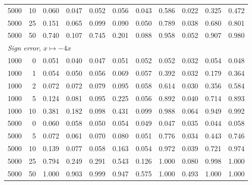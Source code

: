 \begin{table}[htbp]
\begin{tabular}{rrrrrrrrrrr}
5000 & 10 & 0.060 & 0.047 & 0.052 & 0.056 & 0.043 & \cellcolor{black!12}0.586 & 0.022 & \cellcolor{black!12}0.325 & \cellcolor{black!12}0.472 \\
5000 & 25 & \cellcolor{black!12}0.151 & 0.065 & 0.099 & 0.090 & 0.050 & \cellcolor{black!12}0.789 & 0.038 & \cellcolor{black!12}0.680 & \cellcolor{black!12}0.801 \\
5000 & 50 & \cellcolor{black!12}0.740 & \cellcolor{black!12}0.107 & \cellcolor{black!12}0.745 & \cellcolor{black!12}0.201 & 0.088 & \cellcolor{black!12}0.958 & 0.052 & \cellcolor{black!12}0.907 & \cellcolor{black!12}0.980 \\
\hline
\multicolumn{11}{l}{\emph{Sign error}, $x\mapsto-4x$} \\
1000 & 0 & 0.051 & 0.040 & 0.047 & 0.051 & 0.052 & 0.052 & 0.032 & 0.054 & 0.048 \\
1000 & 1 & 0.054 & 0.050 & 0.056 & 0.069 & 0.057 & \cellcolor{black!12}0.392 & 0.032 & \cellcolor{black!12}0.179 & \cellcolor{black!12}0.364 \\
1000 & 2 & 0.072 & 0.072 & 0.079 & 0.095 & 0.058 & \cellcolor{black!12}0.614 & 0.030 & \cellcolor{black!12}0.356 & \cellcolor{black!12}0.584 \\
1000 & 5 & \cellcolor{black!12}0.124 & 0.081 & 0.095 & \cellcolor{black!12}0.225 & 0.056 & \cellcolor{black!12}0.892 & 0.040 & \cellcolor{black!12}0.714 & \cellcolor{black!12}0.893 \\
1000 & 10 & \cellcolor{black!12}0.381 & \cellcolor{black!12}0.182 & 0.098 & \cellcolor{black!12}0.431 & 0.099 & \cellcolor{black!12}0.988 & 0.064 & \cellcolor{black!12}0.949 & \cellcolor{black!12}0.992 \\
5000 & 0 & 0.060 & 0.058 & 0.050 & 0.054 & 0.049 & 0.047 & 0.035 & 0.044 & 0.058 \\
5000 & 5 & 0.072 & 0.061 & 0.070 & 0.080 & 0.051 & \cellcolor{black!12}0.776 & 0.034 & \cellcolor{black!12}0.443 & \cellcolor{black!12}0.746 \\
5000 & 10 & \cellcolor{black!12}0.139 & 0.077 & 0.058 & \cellcolor{black!12}0.163 & 0.054 & \cellcolor{black!12}0.972 & 0.039 & \cellcolor{black!12}0.721 & \cellcolor{black!12}0.974 \\
5000 & 25 & \cellcolor{black!12}0.794 & \cellcolor{black!12}0.249 & \cellcolor{black!12}0.291 & \cellcolor{black!12}0.543 & \cellcolor{black!12}0.126 & \cellcolor{black!12}1.000 & 0.080 & \cellcolor{black!12}0.998 & \cellcolor{black!12}1.000 \\
5000 & 50 & \cellcolor{black!12}1.000 & \cellcolor{black!12}0.903 & \cellcolor{black!12}0.999 & \cellcolor{black!12}0.947 & \cellcolor{black!12}0.575 & \cellcolor{black!12}1.000 & \cellcolor{black!12}0.493 & \cellcolor{black!12}1.000 & \cellcolor{black!12}1.000 \\
\hline\end{tabular}\end{table}
